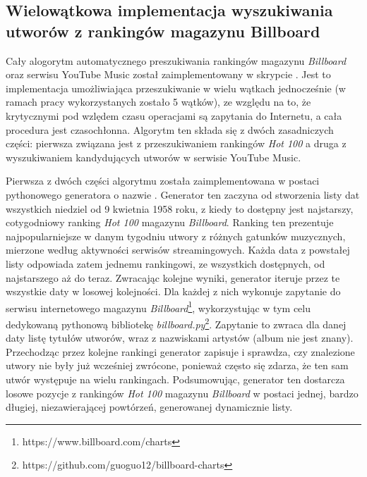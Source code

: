 \subsection{Wielowątkowa implementacja wyszukiwania utworów z rankingów magazynu Billboard}

Cały alogorytm automatycznego preszukiwania rankingów magazynu \emph{Billboard} oraz serwisu YouTube
Music został zaimplementowany w skrypcie . Jest
to implementacja umożliwiająca przeszukiwanie w wielu wątkach jednocześnie (w ramach pracy
wykorzystanych zostało 5 wątków), ze względu na to, że krytycznymi pod wzlędem czasu operacjami są
zapytania do Internetu, a cała procedura jest czasochłonna. Algorytm ten składa się z dwóch
zasadniczych części: pierwsza związana jest z przeszukiwaniem rankingów \emph{Hot 100} a druga z
wyszukiwaniem kandydujących utworów w serwisie YouTube Music.

Pierwsza z dwóch części algorytmu została zaimplementowana w postaci pythonowego generatora o nazwie
. Generator ten zaczyna od stworzenia listy dat wszystkich
niedziel od 9 kwietnia 1958 roku, z kiedy to dostępny jest najstarszy, cotygodniowy ranking
\emph{Hot 100} magazynu \emph{Billboard}. Ranking ten prezentuje najpopularniejsze w danym tygodniu
utwory z różnych gatunków muzycznych, mierzone według aktywności serwisów streamingowych. Każda data
z powstałej listy odpowiada zatem jednemu rankingowi, ze wszystkich dostępnych, od najstarszego aż
do teraz. Zwracając kolejne wyniki, generator iteruje przez te wszystkie daty w losowej kolejności.
Dla każdej z nich wykonuje zapytanie do serwisu internetowego magazynu
\emph{Billboard}\footnote{https://www.billboard.com/charts}, wykorzystując w tym celu dedykowaną
pythonową bibliotekę \emph{billboard.py}\footnote{https://github.com/guoguo12/billboard-charts}.
Zapytanie to zwraca dla danej daty listę tytułów utworów, wraz z nazwiskami artystów (album nie jest
znany). Przechodząc przez kolejne rankingi generator zapisuje i sprawdza, czy znalezione utwory nie
były już wcześniej zwrócone, ponieważ często się zdarza, że ten sam utwór występuje na wielu
rankingach. Podsumowując, generator ten dostarcza losowe pozycje z rankingów \emph{Hot 100} magazynu
\emph{Billboard} w postaci jednej, bardzo długiej, niezawierającej powtórzeń, generowanej
dynamicznie listy.

